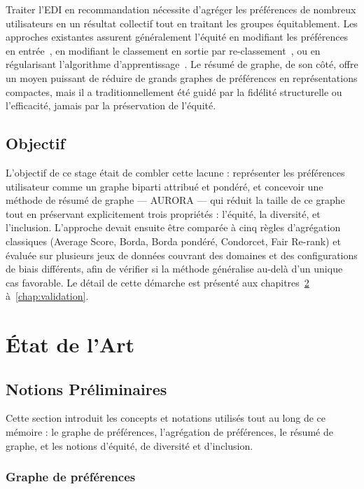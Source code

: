 \documentclass[12pt]{report}
\begin{document}
Traiter l'EDI en recommandation nécessite d'agréger les préférences de
nombreux utilisateurs en un résultat collectif tout en traitant les
groupes équitablement. Les approches existantes assurent généralement
l'équité en modifiant les préférences en entrée~\cite{kamiran2012data},
en modifiant le
classement en sortie par re-classement~\cite{singh2018fairness}, ou en
régularisant l'algorithme
d'apprentissage~\cite{zhao_fairness_2024}. Le résumé de graphe, de son côté, offre un moyen
puissant de réduire de grands graphes de préférences en représentations
compactes, mais il a traditionnellement été guidé par la fidélité
structurelle ou l'efficacité, jamais par la préservation de l'équité.

\section{Objectif}

L'objectif de ce stage était de combler cette lacune : représenter les
préférences utilisateur comme un graphe biparti attribué et pondéré, et
concevoir une méthode de résumé de graphe --- AURORA --- qui réduit la
taille de ce graphe tout en préservant explicitement trois propriétés :
l'équité, la diversité, et l'inclusion. L'approche devait ensuite être
comparée à cinq règles d'agrégation classiques (Average Score, Borda,
Borda pondéré, Condorcet, Fair Re-rank) et évaluée sur plusieurs jeux de
données couvrant des domaines et des configurations de biais différents,
afin de vérifier si la méthode généralise au-delà d'un unique cas
favorable. Le détail de cette démarche est présenté aux
chapitres~\ref{chap:etat-art} à~\ref{chap:validation}.

\chapter{État de l'Art}
\label{chap:etat-art}

\section{Notions Préliminaires}
\label{sec:background}

Cette section introduit les concepts et notations utilisés tout au long de
ce mémoire : le graphe de préférences, l'agrégation de préférences, le
résumé de graphe, et les notions d'équité, de diversité et d'inclusion.

\subsection{Graphe de préférences}
\end{document}
